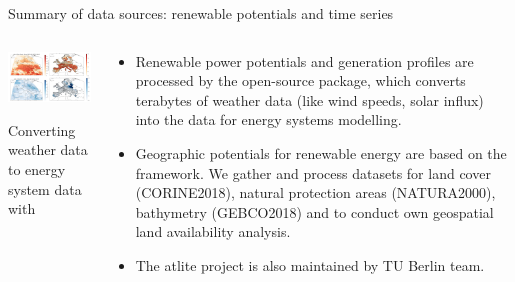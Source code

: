 \begin{frame}{Summary of data sources: renewable potentials and time series}
 
  \begin{columns}[T]
  \begin{column}{9cm}

  \vspace{0.3cm}
  \centering

  \includegraphics[width=9cm]{images/atlite.jpg}

  {\footnotesize 
  Converting weather data to energy system data with 
  }
  \end{column}

  \begin{column}{7cm}
  {\small 
  \begin{itemize}
    \item Renewable power potentials and generation profiles are processed by 
    the open-source  package, 
    which converts terabytes of weather data (like wind speeds, solar influx) 
    into the data for energy systems modelling.
    \item Geographic potentials for renewable energy are based on the
     framework. We gather and process
    datasets for land cover (CORINE2018), natural protection areas (NATURA2000),
    bathymetry (GEBCO2018) and  
    to conduct own geospatial land availability analysis.
    \item The \alert{atlite} project is also maintained by TU Berlin team.

  \end{itemize}
  }
  
  \end{column}
  \end{columns}

\end{frame}


